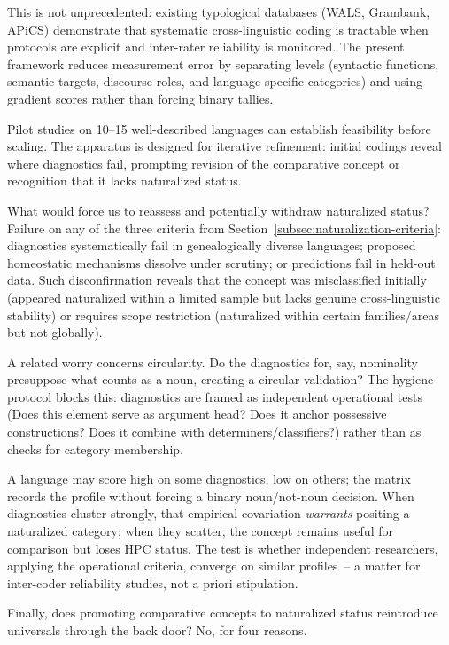 \documentclass[12pt]{article}
\begin{document}
This is not unprecedented: existing typological databases (WALS, Grambank, APiCS) demonstrate that systematic cross-linguistic coding is tractable when protocols are explicit and inter-rater reliability is monitored. The present framework reduces measurement error by separating levels (syntactic functions, semantic targets, discourse roles, and language-specific categories) and using gradient scores rather than forcing binary tallies.

Pilot studies on 10--15 well-described languages can establish feasibility before scaling. The apparatus is designed for iterative refinement: initial codings reveal where diagnostics fail, prompting revision of the comparative concept or recognition that it lacks naturalized status.

What would force us to reassess and potentially withdraw naturalized status? Failure on any of the three criteria from Section~\ref{subsec:naturalization-criteria}: diagnostics systematically fail in genealogically diverse languages; proposed homeostatic mechanisms dissolve under scrutiny; or predictions fail in held-out data. Such disconfirmation reveals that the concept was misclassified initially (appeared naturalized within a limited sample but lacks genuine cross-linguistic stability) or requires scope restriction (naturalized within certain families/areas but not globally).

A related worry concerns circularity. Do the diagnostics for, say, nominality presuppose what counts as a noun, creating a circular validation? The hygiene protocol blocks this: diagnostics are framed as independent operational tests (Does this element serve as argument head? Does it anchor possessive constructions? Does it combine with determiners/classifiers?) rather than as checks for category membership.

A language may score high on some diagnostics, low on others; the matrix records the profile without forcing a binary noun/not-noun decision. When diagnostics cluster strongly, that empirical covariation \emph{warrants} positing a naturalized category; when they scatter, the concept remains useful for comparison but loses HPC status. The test is whether independent researchers, applying the operational criteria, converge on similar profiles~-- a matter for inter-coder reliability studies, not a priori stipulation.

Finally, does promoting comparative concepts to naturalized status reintroduce universals through the back door? No, for four reasons.
\end{document}
